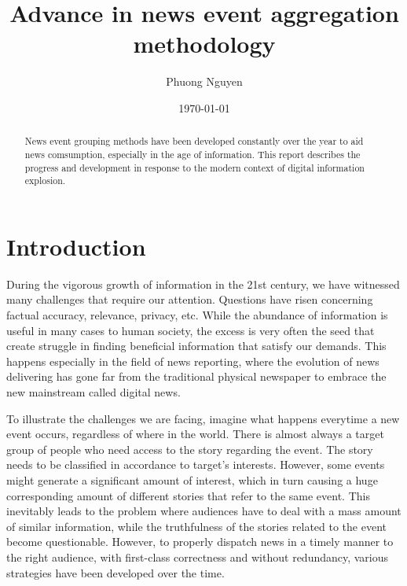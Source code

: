 \documentclass[english]{tktltiki}
\begin{document}
\onehalfspacing

\title{Advance in news event aggregation methodology}
\author{Phuong Nguyen}
\date{\today}

\maketitle




\begin{abstract}

News event grouping methods have been developed constantly over the year to aid news comsumption, especially in the age of information. This report describes the progress and development in response to the modern context of digital information explosion.

\end{abstract}

\mytableofcontents




\section{Introduction}

During the vigorous growth of information in the 21st century, we have witnessed many challenges that require our attention. Questions have risen concerning factual accuracy, relevance, privacy, etc. While the abundance of information is useful in many cases to human society, the excess is very often the seed that create struggle in finding beneficial information that satisfy our demands. This happens especially in the field of news reporting, where the evolution of news delivering has gone far from the traditional physical newspaper to embrace the new mainstream called digital news. 

To illustrate the challenges we are facing, imagine what happens everytime a new event occurs, regardless of where in the world. There is almost always a target group of people who need access to the story regarding the event. The story needs to be classified in accordance to target's interests. However, some events might generate a significant amount of interest, which in turn causing a huge corresponding amount of different stories that refer to the same event. This inevitably leads to the problem where audiences have to deal with a mass amount of similar information, while the truthfulness of the stories related to the event become questionable. However, to properly dispatch news in a timely manner to the right audience, with first-class correctness and without redundancy, various strategies have been developed over the time.
\end{document}
